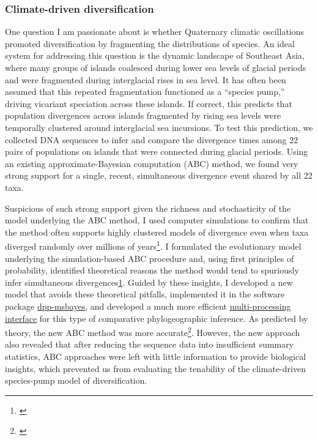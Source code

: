 \subsubsection*{Climate-driven diversification}
One question I am passionate about is whether Quaternary climatic oscillations
promoted diversification by fragmenting the distributions of species.
An ideal system for addressing this question is the dynamic landscape of
Southeast Asia, where many groups of islands coalesced during lower sea levels
of glacial periods and were fragmented during interglacial rises in sea level.
It has often been assumed that this repeated fragmentation functioned as a
``species pump,'' driving vicariant speciation across these islands.
If correct, this predicts that population divergences across islands fragmented
by rising sea levels were temporally clustered around interglacial sea
incursions.
To test this prediction, we collected DNA sequences to infer and compare the
divergence times among 22 pairs of populations on islands that were connected
during glacial periods.
Using an existing approximate-Bayesian computation (ABC) method, we found very
strong support
for a single, recent, simultaneous divergence event shared by all 22 taxa.

Suspicious of such strong support given the richness and stochasticity of the
model underlying the ABC method, I used computer simulations to confirm that
the method often supports highly clustered models of divergence even when taxa
diverged randomly over millions of years\footnote{\label{Oaks12}}.
I formulated the evolutionary model underlying the simulation-based ABC
procedure and, using first principles of probability, identified theoretical
reasons the method would tend to spuriously infer simultaneous
divergences\cref{Oaks12}.
Guided by these insights, I developed a new model that avoids these theoretical
pitfalls,
implemented it in the software package
\href{https://github.com/joaks1/dpp-msbayes}{dpp-msbayes},
and developed a much more efficient 
\href{https://joaks1.github.io/PyMsBayes/}{multi-processing interface}
for this type of comparative phylogeographic inference.
As predicted by theory, the new ABC method was more
accurate\footnote{\label{Oaks14dpp}}.
However, the new approach also revealed that after reducing the sequence data
into insufficient summary statistics, ABC approaches were left with little
information to provide biological insights,
which prevented us from evaluating the tenability of the climate-driven
species-pump model of diversification.

